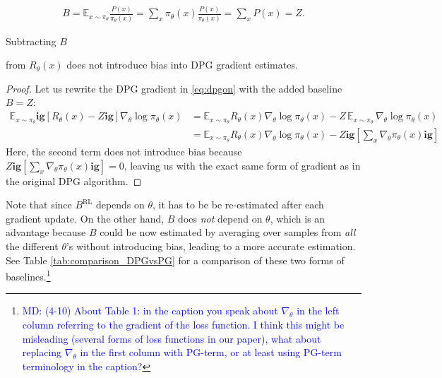 \begin{equation}
 \label{eq:B}
\begin{aligned}
    B = \mathbb{E}_{x\sim {\pi_\theta}} \frac{P(x)}{{\pi_\theta}(x)} = \sum_x {\pi_\theta}(x) \frac{P(x)}{{\pi_\theta}(x)} = \sum_x P(x) = Z.
\end{aligned}
\end{equation}

\begin{fact}
\label{dpgon_baseline_unbiased}
Subtracting $B$ 

from $R_\theta(x)$ does not introduce bias into DPG gradient estimates.

\end{fact}

\begin{proof}
Let us rewrite the DPG gradient in \eqref{eq:dpgon} with the added baseline $B=Z$:
\begin{equation}
\begin{aligned}
   \mathbb{E}_{x \sim {\pi_\theta}} \mathbf{ig}[ R_\theta(x) - Z \mathbf{ig}] \nabla_{\theta} \log {\pi_\theta}(x)
    &=\mathbb{E}_{x \sim {\pi_\theta}} R_\theta(x) \nabla_{\theta} \log {\pi_\theta}(x) 
    -Z \,\mathbb{E}_{x \sim {\pi_\theta}} \, \nabla_{\theta} \log {\pi_\theta}(x) \\
    &=\mathbb{E}_{x \sim {\pi_\theta}} R_\theta(x) \nabla_{\theta} \log {\pi_\theta}(x) 
    - Z \mathbf{ig}[\sum_{x} \nabla_{\theta} {\pi_\theta}(x) \mathbf{ig}]
\end{aligned}
\end{equation}
Here, the second term does not introduce bias because $Z \mathbf{ig}[\sum_x \nabla_\theta {\pi_\theta}(x) \mathbf{ig}]= 0$, leaving us with the exact same form of gradient as in the original DPG algorithm.
\end{proof}

Note that since $B^{\text{RL}}$ depends on $\theta$, it has to be be re-estimated after each gradient update. On the other hand, $B$ does \emph{not} depend on $\theta$, which is an advantage because $B$ could be now estimated by averaging over samples from \emph{all} the different $\theta$'s without introducing bias, leading to a more accurate estimation. See Table \ref{tab:comparison_DPGvsPG} for a comparison of these two forms of baselines.{\color{blue}\footnote{\textcolor{blue}{MD: (4-10) About Table 1: in the caption you speak about $\nabla_\theta$ in the left column referring to the gradient of the loss function. I think this might be misleading (several forms of loss functions in our paper), what about replacing $\nabla_\theta$ in the first column with PG-term, or at least using PG-term terminology in the caption?}}}

